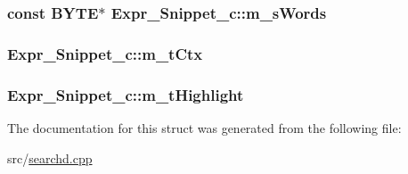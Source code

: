 \hypertarget{structExpr__Snippet__c_aaa6419d695ac0d9758296ee2b5c73d1b}{
\subsubsection[{m\-\_\-s\-Words}]{\setlength{\rightskip}{0pt plus 5cm}const {\bf B\-Y\-T\-E}$\ast$ Expr\-\_\-\-Snippet\-\_\-c\-::m\-\_\-s\-Words}}\label{structExpr__Snippet__c_aaa6419d695ac0d9758296ee2b5c73d1b}
\hypertarget{structExpr__Snippet__c_aed59c73c2cc2df70ea24c335cdfe5d80}{
\subsubsection[{m\-\_\-t\-Ctx}]{ Expr\-\_\-\-Snippet\-\_\-c\-::m\-\_\-t\-Ctx}}\label{structExpr__Snippet__c_aed59c73c2cc2df70ea24c335cdfe5d80}
\hypertarget{structExpr__Snippet__c_a17e42a66852f03a5a8de2bb1ed6787dc}{
\subsubsection[{m\-\_\-t\-Highlight}]{ Expr\-\_\-\-Snippet\-\_\-c\-::m\-\_\-t\-Highlight\hspace{0.3cm}{\ttfamily [mutable]}}}\label{structExpr__Snippet__c_a17e42a66852f03a5a8de2bb1ed6787dc}


The documentation for this struct was generated from the following file\-:\begin{DoxyCompactItemize}
\item 
src/\hyperlink{searchd_8cpp}{searchd.\-cpp}\end{DoxyCompactItemize}
